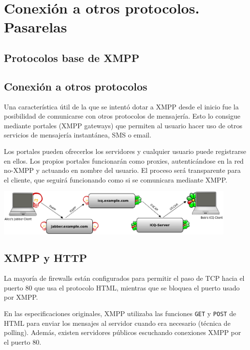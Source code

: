 \documentclass[a4paper, 11pt]{article} %
\begin{document}
      
\section{Conexión a otros protocolos. Pasarelas}
  \subsection{Protocolos base de XMPP}

  \subsection{Conexión a otros protocolos}
    Una característica útil de la que se intentó dotar a XMPP desde el inicio
    fue la posibilidad de comunicarse con otros protocolos de mensajería.
    Esto lo consigue mediante portales (XMPP gateways) que permiten al usuario
    hacer uso de otros servicios de mensajería instantánea, SMS o email.
    
    Los portales pueden ofrecerlos los servidores y cualquier usuario puede
    registrarse en ellos. Los propios portales funcionarán como proxies,
    autenticándose en la red no-XMPP y actuando en nombre del usuario.
    El proceso será transparente para el cliente, que seguirá funcionando
    como si se comunicara mediante XMPP.
    
    \begin{center}
      \includegraphics[width=12cm]{external.png}
    \end{center}
    
  \subsection{XMPP y HTTP}
    La mayoría de firewalls están configurados para permitir el 
    paso de TCP hacia el puerto 80 que usa el protocolo HTML, mientras que
    se bloquea el puerto usado por XMPP.
    
    En las especificaciones originales, XMPP utilizaba las funciones \texttt{GET} y
    \texttt{POST} de HTML para enviar los mensajes al servidor cuando era necesario
    (técnica de polling). Además, existen servidores públicos escuchando conexiones
    XMPP por el puerto 80.
    
\end{document}
